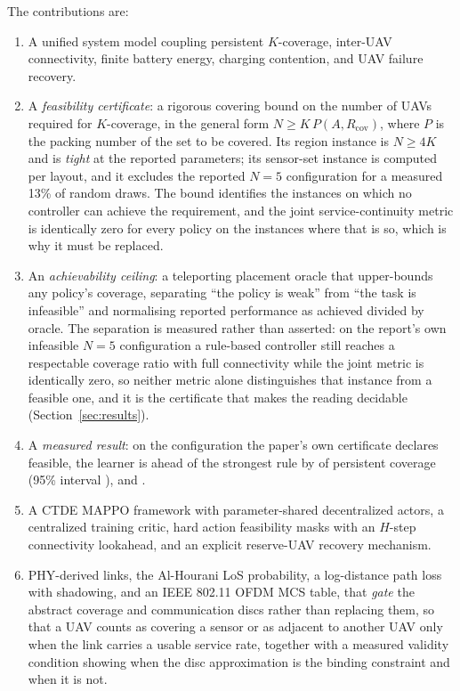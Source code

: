 \documentclass[conference]{IEEEtran}
\begin{document}
The contributions are:
\begin{enumerate}
    \item A unified system model coupling persistent $K$-coverage, inter-UAV connectivity, finite battery energy, charging contention, and UAV failure recovery.
    \item A \emph{feasibility certificate}: a rigorous covering bound on the number of UAVs required for $K$-coverage, in the general form $N \ge K\,P(A,R_{\mathrm{cov}})$, where $P$ is the packing number of the set to be covered.  Its region instance is $N \ge 4K$ and is \emph{tight} at the reported parameters; its sensor-set instance is computed per layout, and it excludes the reported $N=5$ configuration for a measured 13\% of random draws.  The bound identifies the instances on which no controller can achieve the requirement, and the joint service-continuity metric is identically zero for every policy on the instances where that is so, which is why it must be replaced.
    \item An \emph{achievability ceiling}: a teleporting placement oracle that upper-bounds any policy's coverage, separating ``the policy is weak'' from ``the task is infeasible'' and normalising reported performance as achieved divided by oracle.  The separation is measured rather than asserted: on the report's own infeasible $N=5$ configuration a rule-based controller still reaches a respectable coverage ratio with full connectivity while the joint metric is identically zero, so neither metric alone distinguishes that instance from a feasible one, and it is the certificate that makes the reading decidable (Section~\ref{sec:results}).
    \item A \emph{measured result}: on the configuration the paper's own certificate declares feasible, the learner is ahead of the strongest rule by \tokLearnerMinusRule{} of persistent coverage (95\% interval \tokLearnerMinusRuleCi), and \tokGapVerdict.
    \item A CTDE MAPPO framework with parameter-shared decentralized actors, a centralized training critic, hard action feasibility masks with an $H$-step connectivity lookahead, and an explicit reserve-UAV recovery mechanism.
    \item PHY-derived links, the Al-Hourani LoS probability, a log-distance path loss with shadowing, and an IEEE 802.11 OFDM MCS table, that \emph{gate} the abstract coverage and communication discs rather than replacing them, so that a UAV counts as covering a sensor or as adjacent to another UAV only when the link carries a usable service rate, together with a measured validity condition showing when the disc approximation is the binding constraint and when it is not.

\end{enumerate}
\end{document}
